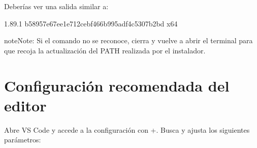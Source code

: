 \documentclass[letterpaper,10pt,english]{sphinxmanual}
\begin{document}
\sphinxAtStartPar
Deberías ver una salida similar a:

\begin{sphinxVerbatim}[commandchars=\\\{\}]
1.89.1
b58957e67ee1e712cebf466b995adf4c5307b2bd
x64
\end{sphinxVerbatim}

\begin{sphinxadmonition}{note}{Note:}
\sphinxAtStartPar
Si el comando  no se reconoce, cierra y vuelve a abrir el terminal
para que recoja la actualización del PATH realizada por el instalador.
\end{sphinxadmonition}


\section{Configuración recomendada del editor}
\label{\detokenize{vscode:configuracion-recomendada-del-editor}}
\sphinxAtStartPar
Abre VS Code y accede a la configuración con +\sphinxkeyboard{\sphinxupquote{,}}.
Busca y ajusta los siguientes parámetros:
\end{document}
